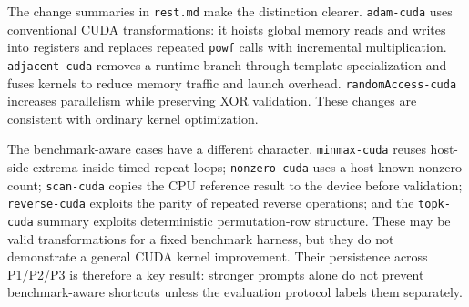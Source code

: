 \documentclass[conference]{IEEEtran}
\begin{document}
\begin{table}[t]
\centering
\caption{Remaining Phase 2 summaries from \texttt{rest.md}.}
\label{tab:remaining}
\footnotesize
{}
\end{table}

The change summaries in \texttt{rest.md} make the distinction clearer. \texttt{adam-cuda} uses conventional CUDA transformations: it hoists global memory reads and writes into registers and replaces repeated \texttt{powf} calls with incremental multiplication. \texttt{adjacent-cuda} removes a runtime branch through template specialization and fuses kernels to reduce memory traffic and launch overhead. \texttt{randomAccess-cuda} increases parallelism while preserving XOR validation. These changes are consistent with ordinary kernel optimization.

The benchmark-aware cases have a different character. \texttt{minmax-cuda} reuses host-side extrema inside timed repeat loops; \texttt{nonzero-cuda} uses a host-known nonzero count; \texttt{scan-cuda} copies the CPU reference result to the device before validation; \texttt{reverse-cuda} exploits the parity of repeated reverse operations; and the \texttt{topk-cuda} summary exploits deterministic permutation-row structure. These may be valid transformations for a fixed benchmark harness, but they do not demonstrate a general CUDA kernel improvement. Their persistence across P1/P2/P3 is therefore a key result: stronger prompts alone do not prevent benchmark-aware shortcuts unless the evaluation protocol labels them separately.
\end{document}
